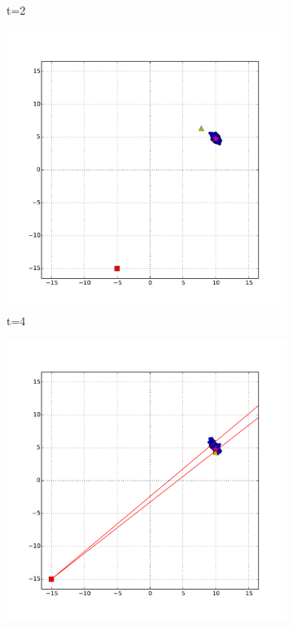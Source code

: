 \begin{figure}
\begin{subfigure}[b]{0.3\textwidth}
                \caption{t=2}
                \label{fig:beam_bad_heading_t_2}
        \end{subfigure}
        \begin{subfigure}[b]{0.3\textwidth}
                \includegraphics[width=\textwidth]{beam_bad_heading_t_4}
                \caption{t=4}
                \label{fig:beam_bad_heading_t_4}
        \end{subfigure}
        \begin{subfigure}[b]{0.3\textwidth}
                \includegraphics[width=\textwidth]{beam_bad_heading_t_6}

\end{subfigure}
\end{figure}
